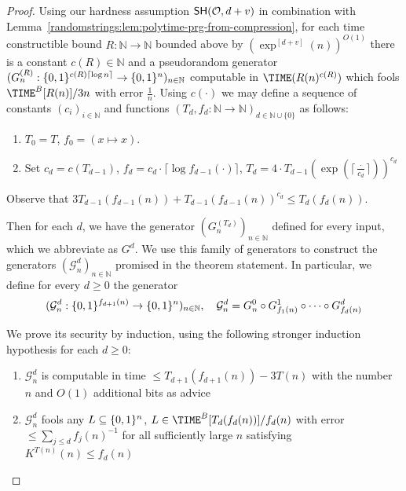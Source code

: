 \begin{proof}
Using our hardness assumption $\mathsf{SH}(\mathcal{O},d+v)$ in combination with Lemma~\ref{randomstrings:lem:polytime-prg-from-compression}, for each time constructible bound $R: \mathbb{N} \to \mathbb{N}$ bounded above by $(\exp^{[d+v]}(n))^{O(1)}$ there is a constant $c(R) \in \mathbb{N}$ and a pseudorandom generator $(G^{(R)}_n: \{0,1\}^{c(R) \lceil \log n \rceil } \to \{0,1\}^n)_{n \in \mathbb{N}}$ computable in $\TIME(R(n)^{c(R)})$ which fools $\TIME^B[R(n)]/3n$ with error $\frac{1}{n}$. Using $c(\cdot)$ we may define a sequence of constants $(c_i)_{i \in \mathbb{N}}$ and functions $(T_d,f_d: \mathbb{N} \to \mathbb{N})_{d \in\mathbb{N} \cup \{0\}}$ as follows:


\begin{enumerate}
    \item $T_0 = T$, $f_0 = (x \mapsto x)$.
    \item Set $c_d = c(T_{d-1})$, $f_d = c_d \cdot \lceil \log f_{d-1}(\cdot) \rceil $, $T_d = 4 \cdot T_{d-1}(\exp(\lceil \frac{\cdot }{c_d} \rceil ))^{c_d}$
\end{enumerate}
Observe that $3T_{d-1}(f_{d-1}(n)) + T_{d-1}(f_{d-1}(n))^{c_d} \leq T_d(f_d(n))$.

Then for each $d$, we have the generator $(G_n^{(T_d)})_{n \in \mathbb{N}}$ defined for every input, which we abbreviate as $G^d$. We use this family of generators to construct the generators $(\mathcal{G}^d_n)_{n \in \mathbb{N}}$ promised in the theorem statement. 
In particular, we define for every $d \geq 0$ the generator
\[
(\mathcal{G}^d_n: \{0,1\}^{f_{d+1}(n)} \to \{0,1\}^{n})_{n \in \mathbb{N}}, \quad  \mathcal{G}^d_n = G_n^0 \circ G^1_{f_1(n)} \circ \cdots \circ G^d_{f_d(n)}
\]

We prove its security by induction, using the following stronger induction hypothesis for each $d \geq 0$: 

\begin{enumerate}
    \item $\mathcal{G}^{d}_n$ is computable in time $\leq T_{d+1}(f_{d+1}(n))- 3T(n)$ with the number $n$ and $ O(1)$ additional bits as advice
    \item $\mathcal{G}^d_n$ fools any $L \subseteq \{0,1\}^n$, $L \in \TIME^B[T_{d}(f_d(n))]/f_d(n)$ with error $\leq \sum_{j \leq d} f_j(n)^{-1}$ for all sufficiently large $n$ satisfying $ K^{T(n)}(n) \leq f_d(n)$
\end{enumerate}



\end{proof}
